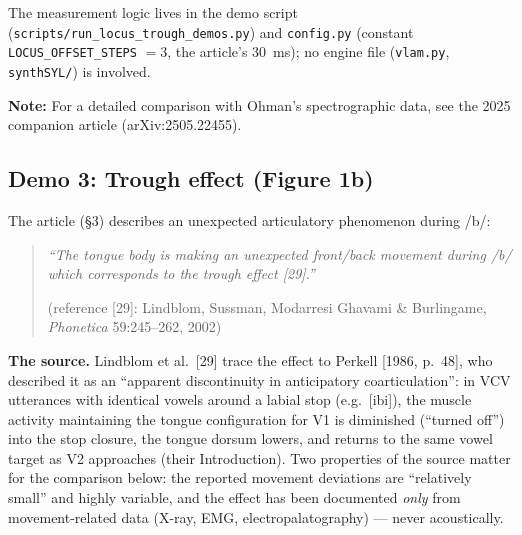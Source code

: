 \documentclass[11pt,a4paper]{article}
\begin{document}
The measurement logic lives in the demo script
(\texttt{scripts/run\_locus\_trough\_demos.py}) and
\texttt{config.py} (constant \texttt{LOCUS\_OFFSET\_STEPS} $= 3$, the
article's 30~ms); no engine file (\texttt{vlam.py},
\texttt{synthSYL/}) is involved.

\textbf{Note:} For a detailed comparison with Ohman's spectrographic
data, see the 2025 companion article (arXiv:2505.22455).

\subsection{Demo 3: Trough effect (Figure 1b)}

The article (\S3) describes an unexpected articulatory phenomenon
during /b/:

\begin{quote}
\itshape
``The tongue body is making an unexpected front/back movement during
/b/ which corresponds to the trough effect [29].''

\smallskip
\hfill (reference [29]: Lindblom, Sussman, Modarresi Ghavami \&
Burlingame, \emph{Phonetica} 59:245--262, 2002)
\end{quote}

\textbf{The source.} Lindblom et al.\ [29] trace the effect to
Perkell [1986, p.~48], who described it as an
``apparent discontinuity in anticipatory coarticulation'': in VCV
utterances with identical vowels around a labial stop (e.g.\
[ibi]), the muscle activity maintaining the tongue configuration for
V1 is diminished (``turned off'') into the stop closure, the tongue
dorsum lowers, and returns to the same vowel target as V2
approaches (their Introduction).
Two properties of the source matter for the comparison below:
the reported movement deviations are ``relatively small'' and highly
variable, and the effect has been documented \emph{only} from
movement-related data (X-ray, EMG, electropalatography) --- never
acoustically.
\end{document}
